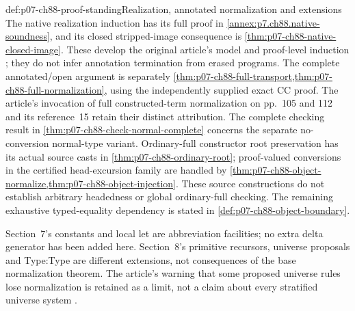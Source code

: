 \begin{proofboundary}{def:p07-ch88-proof-standing}{Realization, annotated normalization and extensions}
The native realization induction has its full proof in
\cref{annex:p7.ch88.native-soundness}, and its closed stripped-image
consequence is \cref{thm:p07-ch88-native-closed-image}. These develop
the original article's model and proof-level induction
\cite[\S\S4--5, pp.~105--110]{CoquandHuet1988}; they do not infer
annotation termination from erased programs. The complete annotated/open
argument is separately
\cref{thm:p07-ch88-full-transport,thm:p07-ch88-full-normalization},
using the independently supplied exact CC proof. The article's invocation
of full constructed-term normalization on pp.~105 and 112 and its
reference~15 retain their distinct attribution. The complete checking
result in \cref{thm:p07-ch88-check-normal-complete} concerns the separate
no-conversion normal-type variant. Ordinary-full constructor root
preservation has its actual source casts in
\cref{thm:p07-ch88-ordinary-root}; proof-valued conversions in the
certified head-excursion family are handled by
\cref{thm:p07-ch88-object-normalize,thm:p07-ch88-object-injection}.
These source constructions do not establish arbitrary headedness or
global ordinary-full checking. The remaining exhaustive typed-equality
dependency is stated in \cref{def:p07-ch88-object-boundary}.

Section~7's constants and local let are abbreviation facilities; no
extra delta generator has been added here. Section~8's primitive
recursors, universe proposals and Type:Type are different extensions,
not consequences of the base normalization theorem. The article's
warning that some proposed universe rules lose normalization is retained
as a limit, not a claim about every stratified universe system
\cite[pp.~105,112--117]{CoquandHuet1988}.
\end{proofboundary}




